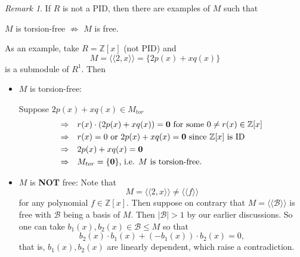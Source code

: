\documentclass[11pt,openany]{book}
\theoremstyle{plain}
\theoremstyle{definition}
\theoremstyle{remark}
\newtheorem{remark}[remark]{Remark}
\begin{document}
\begin{remark}
    If $R$ is not a PID, then there are examples of $M$ such that
    \begin{center}
        $M$ is torsion-free $\not\Rightarrow$ $M$ is free.
    \end{center}
    As an example, take $R=\mathbb{Z}[x]$ (not PID) and
    $$M=\langle\langle 2,x\rangle\rangle=\{2p(x)+xq(x)\}$$
    is a submodule of $R^1$. Then
    \begin{itemize}
        \item $M$ is torsion-free:

        Suppose $2p(x)+xq(x)\in M_{tor}$
        \begin{align*}
            \Rightarrow &\quad r(x)\cdot(2p(x)+xq(x))={\bf 0}\text{ for some $0\neq r(x)\in\mathbb{Z}[x]$}\\
            \Rightarrow &\quad r(x)=0\text{ or }2p(x)+xq(x)={\bf 0}\text{ since }\mathbb{Z}[x]\text{ is ID}\\
            \Rightarrow &\quad2p(x)+xq(x)={\bf 0}\\
            \Rightarrow &\quad M_{tor}=\{{\bf 0}\}\text{, i.e. }M\text{ is torsion-free.}
        \end{align*}
        \item $M$ is {\bf NOT} free: Note that
        $$M=\langle\langle 2,x\rangle\rangle\neq\langle\langle f\rangle\rangle$$
        for any polynomial $f\in \mathbb{Z}[x]$. Then suppose on contrary that $M=\langle\langle\mathcal{B}\rangle\rangle$ is free with $\mathcal{B}$ being a basis of $M$. Then $|\mathcal{B}|>1$ by our earlier discussions. So one can take $b_1(x),b_2(x)\in\mathcal{B}\leq M$ so that
        $$b_2(x)\cdot b_1(x)+(-b_1(x))\cdot b_2(x)=0,$$
        that is, $b_1(x),b_2(x)$ are linearly dependent, which raise a contradiction.
    \end{itemize}
\end{remark}
\end{document}
